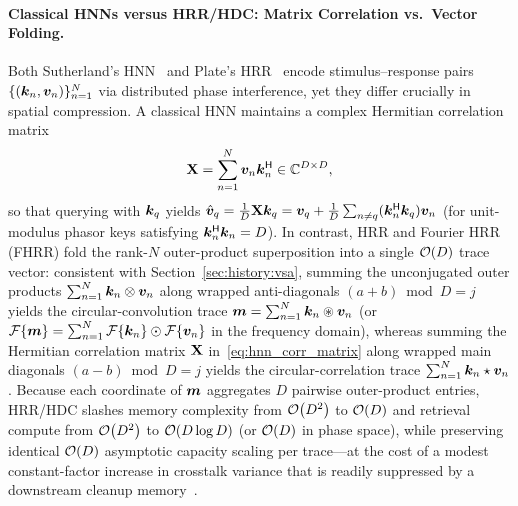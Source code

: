 \paragraph{Classical HNNs versus HRR/HDC: Matrix Correlation vs.\ Vector Folding.}
Both Sutherland's HNN~\cite{SUTHERLAND_1990_HNN} and Plate's HRR~\cite{PLATE_1995_HRR} encode stimulus--response pairs $\{(\boldsymbol{k}_n, \boldsymbol{v}_n)\}_{n=1}^N$ via distributed phase interference, yet they differ crucially in spatial compression.
A classical HNN maintains a complex Hermitian correlation matrix
\begin{equation}\label{eq:hnn_corr_matrix}
    \mathbf{X} = \sum_{n=1}^{N} \boldsymbol{v}_n \boldsymbol{k}_n^{\mathsf{H}} \in \mathbb{C}^{D \times D},
\end{equation}
so that querying with $\boldsymbol{k}_q$ yields $\hat{\boldsymbol{v}}_q = \frac{1}{D}\mathbf{X}\boldsymbol{k}_q = \boldsymbol{v}_q + \frac{1}{D}\sum_{n \neq q} (\boldsymbol{k}_n^{\mathsf{H}}\boldsymbol{k}_q)\boldsymbol{v}_n$ (for unit-modulus phasor keys satisfying $\boldsymbol{k}_n^{\mathsf{H}}\boldsymbol{k}_n = D$).
In contrast, HRR and Fourier HRR (FHRR) fold the rank-$N$ outer-product superposition into a single $\mathcal{O}\!\left(D\right)$ trace vector: consistent with Section~\ref{sec:history:vsa}, summing the unconjugated outer products $\sum_{n=1}^{N} \boldsymbol{k}_n \otimes \boldsymbol{v}_n$ along wrapped anti-diagonals $(a + b) \bmod D = j$ yields the circular-convolution trace $\boldsymbol{m} = \sum_{n=1}^N \boldsymbol{k}_n \circledast \boldsymbol{v}_n$ (or $\mathcal{F}\{\boldsymbol{m}\} = \sum_{n=1}^N \mathcal{F}\{\boldsymbol{k}_n\} \odot \mathcal{F}\{\boldsymbol{v}_n\}$ in the frequency domain), whereas summing the Hermitian correlation matrix $\mathbf{X}$ in~\eqref{eq:hnn_corr_matrix} along wrapped main diagonals $(a - b) \bmod D = j$ yields the circular-correlation trace $\sum_{n=1}^N \boldsymbol{k}_n \star \boldsymbol{v}_n$.
Because each coordinate of $\boldsymbol{m}$ aggregates $D$ pairwise outer-product entries, HRR/HDC slashes memory complexity from $\mathcal{O}\!\left(D^2\right)$ to $\mathcal{O}\!\left(D\right)$ and retrieval compute from $\mathcal{O}\!\left(D^2\right)$ to $\mathcal{O}\!\left(D \log D\right)$ (or $\mathcal{O}\!\left(D\right)$ in phase space), while preserving identical $\mathcal{O}\!\left(D\right)$ asymptotic capacity scaling per trace---at the cost of a modest constant-factor increase in crosstalk variance that is readily suppressed by a downstream cleanup memory~\cite{PLATE_1995_HRR,SCHLEGEL_VSA_COMPARISON}.

